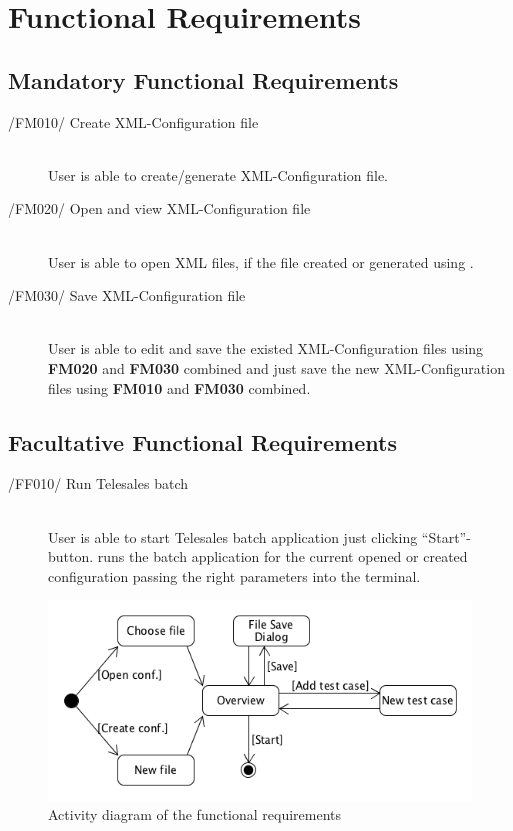\section{Functional Requirements}

\subsection{Mandatory Functional Requirements}
\begin{description}
\item[/FM010/ Create XML-Configuration file]\hfill\\ User is able to create/generate XML-Configuration file.
\item[/FM020/ Open and view XML-Configuration file]\hfill\\ User is able to open XML files, if the file created or generated using \app{}.
\item[/FM030/ Save XML-Configuration file]\hfill\\ User is able to edit and save the existed XML-Configuration files using \textbf{FM020} and \textbf{FM030} combined and just save the new XML-Configuration files using \textbf{FM010} and \textbf{FM030} combined.
\end{description}

\subsection{Facultative Functional Requirements}
\begin{description}
\item[/FF010/ Run Telesales batch]\hfill\\ User is able to start Telesales batch application just clicking ``Start''-button. \app{} runs the batch application for the current opened or created configuration passing the right parameters into the terminal.
\end{description}

\begin{figure}[h!]
\centering
\includegraphics[width=\textwidth]{d_activity.png}
\caption{Activity diagram of the functional requirements}
\end{figure}
